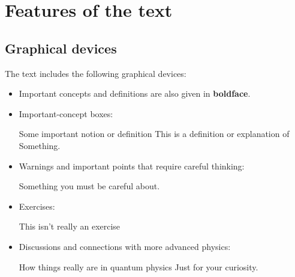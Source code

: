 \documentclass[a4paper,12pt,%
onecolumn,oneside,%
british%
]{memoir}
\renewcommand*{\|}[1][]{\nonscript\:#1\vert\nonscript\:\mathopen{}}
\newcommand*{\sect}{\S}%
\renewcommand*{\autoref}[3][\sect\,\ref]{\textcolor{blue}{#3} {\color{blue}\scriptsize(\faIcon[regular]{eye}\;#1{#2}\;p.\,\pageref{#2})}}
\begin{document}
\section{Features of the text}
\label{sec:guide_text}

\subsection{Graphical devices}

The text includes the following graphical devices:
\begin{itemize}[para]
\item Important concepts and definitions are also given in \textbf{boldface}.

% 

\item Important-concept boxes:
  \begin{definition}{Some important notion or definition}
    This is a definition or explanation of Something.
  \end{definition}
\item Warnings and important points that require careful thinking:
  \begin{warning}[Careful!]
    Something you must be careful about.
  \end{warning}
\item Exercises:
  \begin{exercise}
    This isn't really an exercise
  \end{exercise}
\item Discussions and connections with more advanced physics:
  \begin{extra}{How things really are in quantum physics}
    Just for your curiosity.
  \end{extra}
\end{itemize}
\end{document}
